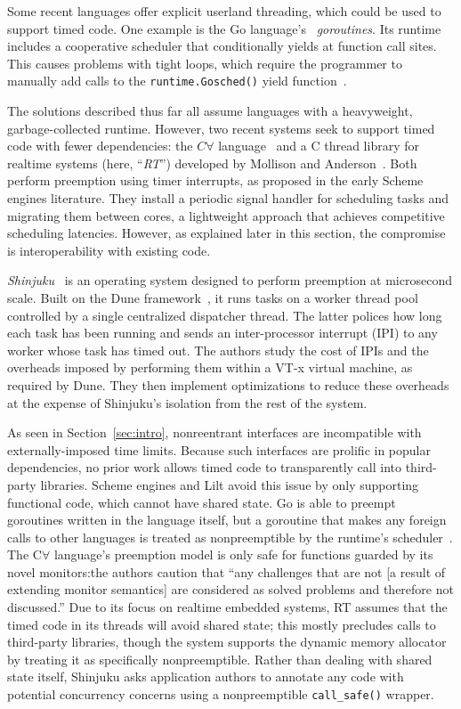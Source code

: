 Some recent languages offer explicit userland threading, which could be used to
support timed
code.  One example is the Go language's~\cite{www-golang} \textit{goroutines}.
Its runtime includes a cooperative scheduler that conditionally yields
at function call sites.  This causes problems with tight loops, which require the
programmer to manually add calls to the \texttt{runtime.Gosched()}
yield function~\cite{www-golang-tightloop}.

The solutions described thus far all assume languages with a heavyweight,
garbage-collected runtime.  However, two recent systems seek
to support timed code with fewer dependencies: the $C\forall$
language~\cite{delisle:wcs2018} and a C thread library for realtime systems (here,
``\textit{RT}'') developed by Mollison and Anderson~\cite{mollison:rtas2013}.
Both perform preemption using timer interrupts, as proposed in the early Scheme
engines literature.  They install a periodic signal handler for scheduling
tasks and migrating them between cores, a lightweight approach that achieves
competitive scheduling latencies.
However, as explained later in this section, the compromise is interoperability with
existing code.

\textit{Shinjuku}~\cite{Kaffes:nsdi2019} is an operating system designed to perform
preemption at microsecond scale.  Built on the Dune framework~\cite{Belay:osdi2012},
it runs tasks on a worker thread pool controlled by a single centralized
dispatcher thread.  The latter polices how long each task has been running and
sends an inter-processor interrupt (IPI) to any worker whose task has timed out.
The authors study the cost of IPIs and the overheads
imposed by performing them within a VT-x virtual machine, as required by Dune.  They
then implement optimizations to reduce these overheads at the expense of Shinjuku's
isolation from the rest of the system.

As seen in Section~\ref{sec:intro}, nonreentrant interfaces are
incompatible with externally-imposed time limits.  Because such interfaces are
prolific in popular dependencies, no prior work allows timed code to transparently
call into third-party libraries.  Scheme engines and
Lilt avoid this issue by only supporting functional code, which cannot have shared
state.  Go is able to preempt goroutines written in the language itself, but a
goroutine that makes any foreign calls to other languages is treated as
nonpreemptible by the runtime's scheduler~\cite{www-golang-fficall}.
The C$\forall$ language's preemption model is only safe for functions guarded
by its novel monitors:\@ the authors caution that ``any challenges that are not [a
result of extending monitor semantics] are considered as solved problems and
therefore not discussed.''
Due to its focus on realtime embedded systems, RT assumes
that the timed code in its threads will avoid shared state; this mostly precludes
calls to third-party libraries, though the system supports the dynamic memory
allocator by treating it as specifically nonpreemptible.  Rather than dealing with
shared state itself, Shinjuku asks application authors to annotate any code with
potential concurrency concerns using a nonpreemptible \texttt{call\_safe()} wrapper.
